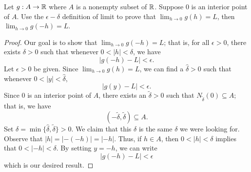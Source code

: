 \documentclass[a4paper]{article}
\begin{document}
\begin{problem}
    Let \( g: A \to \mathbb{R}  \) where \( A  \) is a nonempty subset of \( \mathbb{R}  \). Suppose \( 0  \) is an interior point of \( A  \). Use the \( \epsilon-\delta \) definition of limit to prove that \( \lim_{ h \to 0 }  g(h) = L  \), then \( \lim_{ h \to 0 }  g(-h) = L  \). 
\end{problem}
\begin{proof}
Our goal is to show that \( \lim_{ h \to 0 }  g(-h) = L \); that is, for all \( \epsilon > 0  \), there exists \( \delta > 0  \) such that whenever \( 0 < | h  |  < \delta \), we have 
\[  | g(-h) - L  |  < \epsilon. \]
Let \( \epsilon > 0  \) be given. Since \( \lim_{ h \to 0 } g(h) = L  \), we can find a \( \hat{\delta} > 0  \) such that whenever \( 0 < | y  |  < \hat{\delta} \), 
\[  | g(y) - L  | < \epsilon.   \]
Since \( 0  \) is an interior point of \( A  \), there exists an \( \tilde{\delta} > 0  \) such that \( {N}_{\tilde{\delta}}(0) \subseteq  A  \); that is, we have
\[  (-\tilde{\delta}, \tilde{\delta}) \subseteq A. \]
Set \( \delta = \min \{ \hat{\delta}, \tilde{\delta} \} > 0   \). We claim that this \( \delta  \) is the same \( \delta \) we were looking for. Observe that \( | h  |  = | -(-h) | = | -h  |  \). Thus, if \( h \in A  \), then \( 0 < |  h  |  < \delta \) implies that  \( 0 < | -h  |  < \delta \). By setting \( y = -h  \), we can write
\[  | g(-h) - L  | < \epsilon \]
which is our desired result.
\end{proof}
\end{document}
